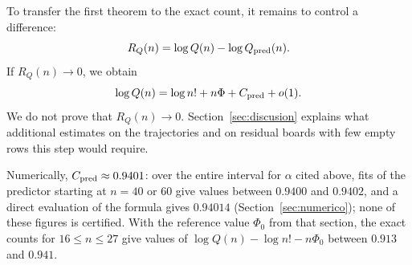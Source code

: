 To transfer the first theorem to the exact count, it remains to control a difference:
\[
 R_Q(n)=\log Q(n)-\log Q_{\rm pred}(n).
\]
If $R_Q(n)\to0$, we obtain
\[
 \log Q(n)=\log n!+n\Phi+C_{\rm pred}+o(1).
\]
We do not prove that $R_Q(n)\to0$. Section~\ref{sec:discusion} explains what additional estimates on the
trajectories
and on residual boards with few empty rows this step would require.

Numerically, $C_{\rm pred}\approx0.9401$: over the entire interval for $\alpha$ cited above, fits of the
predictor starting at $n=40$ or $60$ give values between $0.9400$ and $0.9402$, and a direct evaluation of
the formula gives $0.94014$ (Section~\ref{sec:numerico}); none of these figures is certified.
With the reference value $\Phi_0$ from that section, the exact counts for $16\le n\le27$ give values of
$\log Q(n)-\log n!-n\Phi_0$ between $0.913$ and $0.941$.
